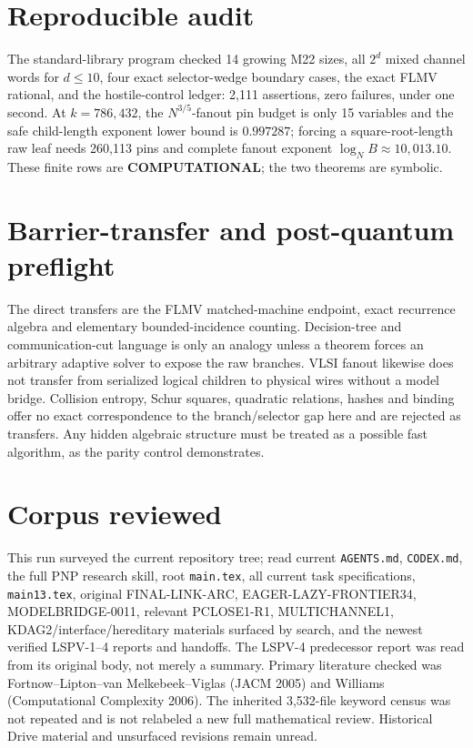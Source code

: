 \documentclass[11pt]{article}
\begin{document}
\section{Reproducible audit}
The standard-library program checked 14 growing M22 sizes, all $2^d$ mixed
channel words for $d\le10$, four exact selector-wedge boundary cases, the exact
FLMV rational, and the hostile-control ledger: 2,111 assertions, zero failures,
under one second.  At $k=786{,}432$, the $N^{3/5}$-fanout pin budget is only 15
variables and the safe child-length exponent lower bound is $0.997287$; forcing
a square-root-length raw leaf needs 260,113 pins and complete fanout exponent
$\log_N B\approx10{,}013.10$.  These finite rows are
\textbf{COMPUTATIONAL}; the two theorems are symbolic.

\section{Barrier-transfer and post-quantum preflight}
The direct transfers are the FLMV matched-machine endpoint, exact recurrence
algebra and elementary bounded-incidence counting.  Decision-tree and
communication-cut language is only an analogy unless a theorem forces an
arbitrary adaptive solver to expose the raw branches.  VLSI fanout likewise
does not transfer from serialized logical children to physical wires without a
model bridge.  Collision entropy, Schur squares, quadratic relations, hashes
and binding offer no exact correspondence to the branch/selector gap here and
are rejected as transfers.  Any hidden algebraic structure must be treated as a
possible fast algorithm, as the parity control demonstrates.

\section{Corpus reviewed}
This run surveyed the current repository tree; read current \texttt{AGENTS.md},
\texttt{CODEX.md}, the full PNP research skill, root \texttt{main.tex}, all
current task specifications, \texttt{main13.tex}, original FINAL-LINK-ARC,
EAGER-LAZY-FRONTIER34, MODELBRIDGE-0011, relevant PCLOSE1-R1, MULTICHANNEL1,
KDAG2/interface/hereditary materials surfaced by search, and the newest
verified LSPV-1--4 reports and handoffs.  The LSPV-4 predecessor report was
read from its original body, not merely a summary.  Primary literature checked
was Fortnow--Lipton--van Melkebeek--Viglas (JACM 2005) and Williams
(Computational Complexity 2006).  The inherited 3,532-file keyword census was
not repeated and is not relabeled a new full mathematical review.  Historical
Drive material and unsurfaced revisions remain unread.
\end{document}
